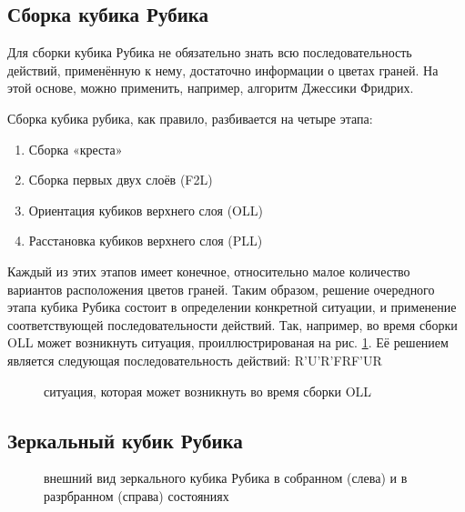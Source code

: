 \documentclass[a4paper, 14pt]{report} %
\begin{document}
	\subsection{Сборка кубика Рубика}
	Для сборки кубика Рубика не обязательно знать всю последовательность действий, применённую к нему, достаточно информации о цветах граней. На этой основе, можно применить, например, алгоритм Джессики Фридрих.
	
	Сборка кубика рубика, как правило, разбивается на четыре этапа:
	\begin{enumerate}
		\item Сборка «креста»
		\item Сборка первых двух слоёв (F2L)
		\item Ориентация кубиков верхнего слоя (OLL)
		\item Расстановка кубиков верхнего слоя (PLL)
	\end{enumerate}
	
	Каждый из этих этапов имеет конечное, относительно малое количество вариантов расположения цветов граней. Таким образом, решение очередного этапа кубика Рубика состоит в определении конкретной ситуации, и применение соответствующей последовательности действий. Так, например, во время сборки OLL может возникнуть ситуация, проиллюстрированая на рис. \ref{c_shape}. Её решением является следующая последовательность действий: R'U'R'FRF'UR
	
	\begin{figure}[ht]
		\caption{ситуация, которая может возникнуть во время сборки OLL}
		\label{c_shape}
	\end{figure}
		
	\subsection{Зеркальный кубик Рубика}
	\begin{figure}[ht]
		\caption{внешний вид зеркального кубика Рубика в собранном (слева) и в разрбранном (справа) состояниях}
		\label{mirrored_cube}
	\end{figure}
\end{document}

